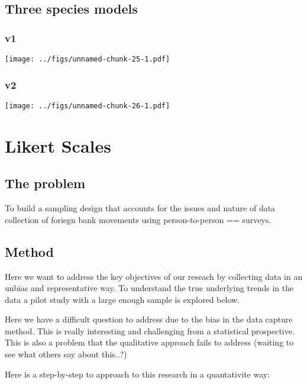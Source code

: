 \documentclass[]{book}
\begin{document}
\hypertarget{three-species-models}{%
\section{Three species models}\label{three-species-models}}

\hypertarget{v1}{%
\subsection{v1}\label{v1}}

\texttt{[image: ../figs/unnamed-chunk-25-1.pdf]}

\hypertarget{v2}{%
\subsection{v2}\label{v2}}

\texttt{[image: ../figs/unnamed-chunk-26-1.pdf]}

\hypertarget{likscale}{%
\chapter{Likert Scales}\label{likscale}}

\hypertarget{the-problem}{%
\section{The problem}\label{the-problem}}

To build a sampling design that accounts for the issues and nature of data collection of foriegn bank movements using person-to-person == surveys.

\hypertarget{method}{%
\section{Method}\label{method}}

Here we want to address the key objectives of our reseach by collecting data in an unbias and representative way. To understand the true underlying trends in the data a pilot study with a large enough sample is explored below.

Here we have a difficult question to address due to the bias in the data capture method. This is really interesting and challenging from a statistical prospective. This is also a problem that the qualitative approach fails to address (waiting to see what others say about this..?)

Here is a step-by-step to approach to this research in a quantativite way:
\end{document}
